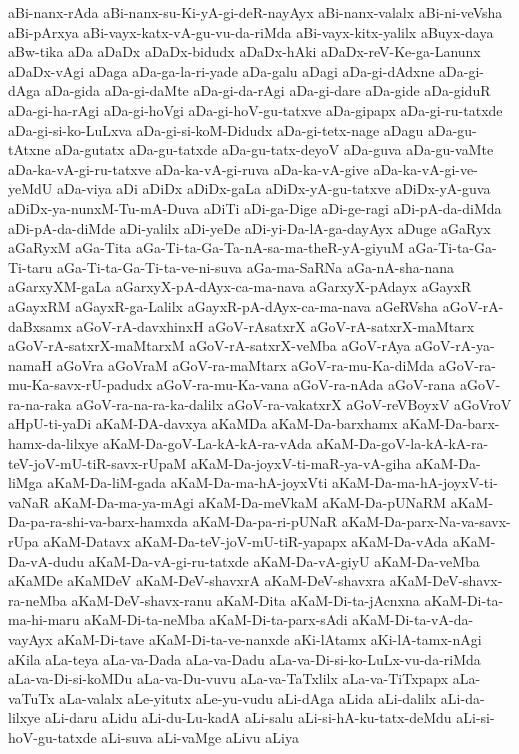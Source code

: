 {aBi-nanx-rAda
aBi-nanx-su-Ki-yA-gi-deR-nayAyx
aBi-nanx-valalx
aBi-ni-veVsha
aBi-pArxya
aBi-vayx-katx-vA-gu-vu-da-riMda
aBi-vayx-kitx-yalilx
aBuyx-daya
aBw-tika
aDa
aDaDx
aDaDx-bidudx
aDaDx-hAki
aDaDx-reV-Ke-ga-Lanunx
aDaDx-vAgi
aDaga
aDa-ga-la-ri-yade
aDa-galu
aDagi
aDa-gi-dAdxne
aDa-gi-dAga
aDa-gida
aDa-gi-daMte
aDa-gi-da-rAgi
aDa-gi-dare
aDa-gide
aDa-giduR
aDa-gi-ha-rAgi
aDa-gi-hoVgi
aDa-gi-hoV-gu-tatxve
aDa-gipapx
aDa-gi-ru-tatxde
aDa-gi-si-ko-LuLxva
aDa-gi-si-koM-Didudx
aDa-gi-tetx-nage
aDagu
aDa-gu-tAtxne
aDa-gutatx
aDa-gu-tatxde
aDa-gu-tatx-deyoV
aDa-guva
aDa-gu-vaMte
aDa-ka-vA-gi-ru-tatxve
aDa-ka-vA-gi-ruva
aDa-ka-vA-give
aDa-ka-vA-gi-ve-yeMdU
aDa-viya
aDi
aDiDx
aDiDx-gaLa
aDiDx-yA-gu-tatxve
aDiDx-yA-guva
aDiDx-ya-nunxM-Tu-mA-Duva
aDiTi
aDi-ga-Dige
aDi-ge-ragi
aDi-pA-da-diMda
aDi-pA-da-diMde
aDi-yalilx
aDi-yeDe
aDi-yi-Da-lA-ga-dayAyx
aDuge
aGaRyx
aGaRyxM
aGa-Tita
aGa-Ti-ta-Ga-Ta-nA-sa-ma-theR-yA-giyuM
aGa-Ti-ta-Ga-Ti-taru
aGa-Ti-ta-Ga-Ti-ta-ve-ni-suva
aGa-ma-SaRNa
aGa-nA-sha-nana
aGarxyXM-gaLa
aGarxyX-pA-dAyx-ca-ma-nava
aGarxyX-pAdayx
aGayxR
aGayxRM
aGayxR-ga-Lalilx
aGayxR-pA-dAyx-ca-ma-nava
aGeRVsha
aGoV-rA-daBxsamx
aGoV-rA-davxhinxH
aGoV-rAsatxrX
aGoV-rA-satxrX-maMtarx
aGoV-rA-satxrX-maMtarxM
aGoV-rA-satxrX-veMba
aGoV-rAya
aGoV-rA-ya-namaH
aGoVra
aGoVraM
aGoV-ra-maMtarx
aGoV-ra-mu-Ka-diMda
aGoV-ra-mu-Ka-savx-rU-padudx
aGoV-ra-mu-Ka-vana
aGoV-ra-nAda
aGoV-rana
aGoV-ra-na-raka
aGoV-ra-na-ra-ka-dalilx
aGoV-ra-vakatxrX
aGoV-reVBoyxV
aGoVroV
aHpU-ti-yaDi
aKaM-DA-davxya
aKaMDa
aKaM-Da-barxhamx
aKaM-Da-barx-hamx-da-lilxye
aKaM-Da-goV-La-kA-kA-ra-vAda
aKaM-Da-goV-la-kA-kA-ra-teV-joV-mU-tiR-savx-rUpaM
aKaM-Da-joyxV-ti-maR-ya-vA-giha
aKaM-Da-liMga
aKaM-Da-liM-gada
aKaM-Da-ma-hA-joyxVti
aKaM-Da-ma-hA-joyxV-ti-vaNaR
aKaM-Da-ma-ya-mAgi
aKaM-Da-meVkaM
aKaM-Da-pUNaRM
aKaM-Da-pa-ra-shi-va-barx-hamxda
aKaM-Da-pa-ri-pUNaR
aKaM-Da-parx-Na-va-savx-rUpa
aKaM-Datavx
aKaM-Da-teV-joV-mU-tiR-yapapx
aKaM-Da-vAda
aKaM-Da-vA-dudu
aKaM-Da-vA-gi-ru-tatxde
aKaM-Da-vA-giyU
aKaM-Da-veMba
aKaMDe
aKaMDeV
aKaM-DeV-shavxrA
aKaM-DeV-shavxra
aKaM-DeV-shavx-ra-neMba
aKaM-DeV-shavx-ranu
aKaM-Dita
aKaM-Di-ta-jAcnxna
aKaM-Di-ta-ma-hi-maru
aKaM-Di-ta-neMba
aKaM-Di-ta-parx-sAdi
aKaM-Di-ta-vA-da-vayAyx
aKaM-Di-tave
aKaM-Di-ta-ve-nanxde
aKi-lAtamx
aKi-lA-tamx-nAgi
aKila
aLa-teya
aLa-va-Dada
aLa-va-Dadu
aLa-va-Di-si-ko-LuLx-vu-da-riMda
aLa-va-Di-si-koMDu
aLa-va-Du-vuvu
aLa-va-TaTxlilx
aLa-va-TiTxpapx
aLa-vaTuTx
aLa-valalx
aLe-yitutx
aLe-yu-vudu
aLi-dAga
aLida
aLi-dalilx
aLi-da-lilxye
aLi-daru
aLidu
aLi-du-Lu-kadA
aLi-salu
aLi-si-hA-ku-tatx-deMdu
aLi-si-hoV-gu-tatxde
aLi-suva
aLi-vaMge
aLivu
aLiya
}
